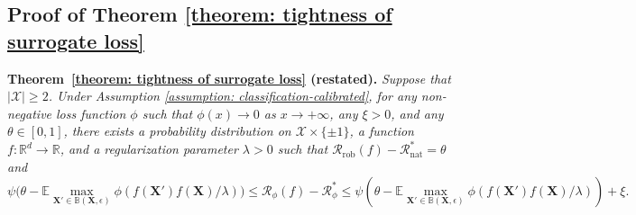 \documentclass[11pt]{article}
\newcommand{\adv}{\mathrm{rob}}
\newcommand{\nat}{\mathrm{nat}}
\newcommand{\R}{\mathbb{R}}
\newcommand{\X}{\bm{X}}
\newcommand{\0}{\mathbf{0}}
\newcommand{\1}{\mathbf{1}}
\newcommand{\cR}{\mathcal{R}}
\newcommand{\cX}{\mathcal{X}}
\newcommand{\bbB}{\mathbb{B}}
\newcommand{\bbE}{\mathbb{E}}
\begin{document}
\subsection{Proof of Theorem \ref{theorem: tightness of surrogate loss}}


\medskip
\noindent\textbf{Theorem~\ref{theorem: tightness of surrogate loss} (restated).}
\emph{Suppose that $|\cX|\ge 2$. Under Assumption \ref{assumption: classification-calibrated}, for any non-negative loss function $\phi$ such that $\phi(x)\rightarrow 0$ as $x\rightarrow +\infty$, any $\xi>0$, and any $\theta\in[0,1]$, there exists a probability distribution on $\cX\times \{\pm 1\}$, a function $f:\R^d\rightarrow\R$, and a regularization parameter $\lambda>0$ such that
$\cR_\adv(f)-\cR_\nat^*=\theta$
and
\begin{equation*}
\psi\Big(\theta-\bbE \max_{\X'\in\bbB(\X,\epsilon)}\phi(f(\X')f(\X)/\lambda)\Big)\le \cR_\phi(f)-\cR_\phi^*\le \psi\left(\theta-\bbE \max_{\X'\in\bbB(\X,\epsilon)}\phi(f(\X')f(\X)/\lambda)\right)+\xi.
\end{equation*}}
\end{document}
